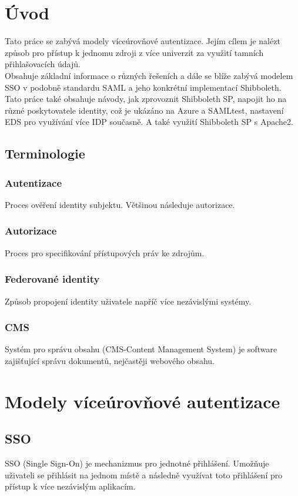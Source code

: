 \chapter{Úvod}
Tato práce se zabývá modely víceúrovňové autentizace. Jejím cílem je nalézt způsob pro přístup k jednomu zdroji z více univerzit za využití tamních přihlašovacích údajů.\\
Obsahuje základní informace o různých řešeních a dále se blíže zabývá modelem SSO v podobně standardu SAML a jeho konkrétní implementací Shibboleth.\\
Tato práce také obsahuje návody, jak zprovoznit Shibboleth SP, napojit ho na různé poskytovatele identity, což je ukázáno na Azure a SAMLtest, nastavení EDS pro využívání více IDP současně. A také využití Shibboleth SP s Apache2.\\


\section{Terminologie}
\subsection{Autentizace}
Proces ověření identity subjektu. Většinou následuje autorizace.\cite{Authorization}
\subsection{Autorizace}
Proces pro specifikování přístupových práv ke zdrojům.\cite{Autentizace}
 \subsection{Federované identity}
Způsob propojení identity uživatele napříč více nezávislými systémy. \cite{federatedIdentities}
\subsection{CMS} %
Systém pro správu obsahu (CMS-Content Management System) je software zajišťující správu dokumentů, nejčastěji webového obsahu. %

\chapter{Modely víceúrovňové autentizace}
\section{SSO}
\label{sso}
SSO (Single Sign-On) je mechanizmus pro jednotné přihlášení. Umožňuje uživateli se přihlásit na jednom místě a následně využívat toto přihlášení pro přístup k více nezávislým aplikacím. \cite{SSO}

